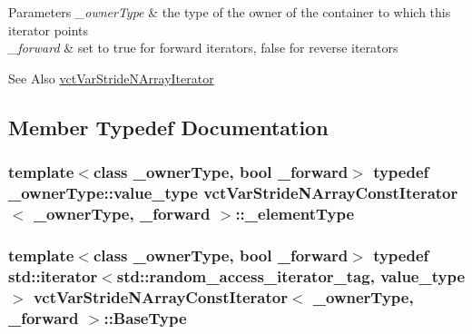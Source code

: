 \begin{DoxyParams}{Parameters}
{\em \-\_\-owner\-Type} & the type of the owner of the container to which this iterator points \\
\hline
{\em \-\_\-forward} & set to true for forward iterators, false for reverse iterators\\
\hline
\end{DoxyParams}
\begin{DoxySeeAlso}{See Also}
\hyperlink{classvct_var_stride_n_array_iterator}{vct\-Var\-Stride\-N\-Array\-Iterator} 
\end{DoxySeeAlso}


\subsection{Member Typedef Documentation}
\hypertarget{classvct_var_stride_n_array_const_iterator_adb02654cc147e6ce3ceef03ebe78c4e2}{
\subsubsection[{\-\_\-element\-Type}]{\setlength{\rightskip}{0pt plus 5cm}template$<$class \-\_\-owner\-Type, bool \-\_\-forward$>$ typedef \-\_\-owner\-Type\-::value\-\_\-type {\bf vct\-Var\-Stride\-N\-Array\-Const\-Iterator}$<$ \-\_\-owner\-Type, \-\_\-forward $>$\-::{\bf \-\_\-element\-Type}}}\label{classvct_var_stride_n_array_const_iterator_adb02654cc147e6ce3ceef03ebe78c4e2}
\hypertarget{classvct_var_stride_n_array_const_iterator_a7aa82e6a4135b2dca6679c1253c9aa34}{
\subsubsection[{Base\-Type}]{\setlength{\rightskip}{0pt plus 5cm}template$<$class \-\_\-owner\-Type, bool \-\_\-forward$>$ typedef std\-::iterator$<$std\-::random\-\_\-access\-\_\-iterator\-\_\-tag, value\-\_\-type$>$ {\bf vct\-Var\-Stride\-N\-Array\-Const\-Iterator}$<$ \-\_\-owner\-Type, \-\_\-forward $>$\-::{\bf Base\-Type}}}\label{classvct_var_stride_n_array_const_iterator_a7aa82e6a4135b2dca6679c1253c9aa34}
